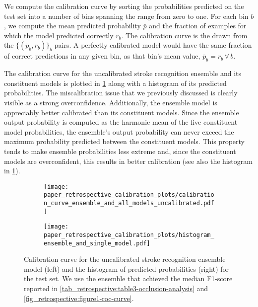 We compute the calibration curve by sorting the probabilities predicted on the test set into a number of bins spanning the range from zero to one. For each bin $b$, we compute the mean predicted probability $\bar{p}$ and the fraction of examples for which the model predicted correctly $r_{b}$. The calibration curve is the drawn from the $\{(\bar{p}_{b}, r_{b})\}_b$ pairs. A perfectly calibrated model would have the same fraction of correct predictions in any given bin, as that bin's mean value, $\bar{p}_{b} = r_{b}\,\forall\,b$. 

The calibration curve for the uncalibrated stroke recognition ensemble and its constituent models is plotted in \cref{fig_discussion:retrospective-paper-calibration-curve-of-uncalibrated-model} along with a histogram of its predicted probabilities. The miscalibration issue that we previously discussed is clearly visible as a strong overconfidence. 
Additionally, the ensemble model is appreciably better calibrated than its constituent models. Since the ensemble output probability is computed as the harmonic mean of the five constituent model probabilities, the ensemble's output probability can never exceed the maximum probability predicted between the constituent models. This property tends to make ensemble probabilities less extreme and, since the constituent models are overconfident, this results in better calibration (see also the histogram in \cref{fig_discussion:retrospective-paper-calibration-curve-of-uncalibrated-model}). 

\begin{figure}
    \begin{subfigure}[c]{0.48\columnwidth}
        \centering
        \texttt{[image: paper\_retrospective\_calibration\_plots/calibration\_curve\_ensemble\_and\_all\_models\_uncalibrated.pdf]}
    \end{subfigure}
    \begin{subfigure}[c]{0.48\columnwidth}
        \centering
        \texttt{[image: paper\_retrospective\_calibration\_plots/histogram\_ensemble\_and\_single\_model.pdf]}
    \end{subfigure}
    \caption[Calibration curve for the uncalibrated stroke recognition model and empirical distribution of predicted probabilities.]{%
        Calibration curve for the uncalibrated stroke recognition ensemble model (left) and the histogram of predicted probabilities (right) for the test set. 
        We use the ensemble that achieved the median F1-score reported in \cref{tab_retrospective:table3-occlusion-analysis} and \cref{fig_retrospective:figure1-roc-curve}.}
    \label{fig_discussion:retrospective-paper-calibration-curve-of-uncalibrated-model}
\end{figure}

